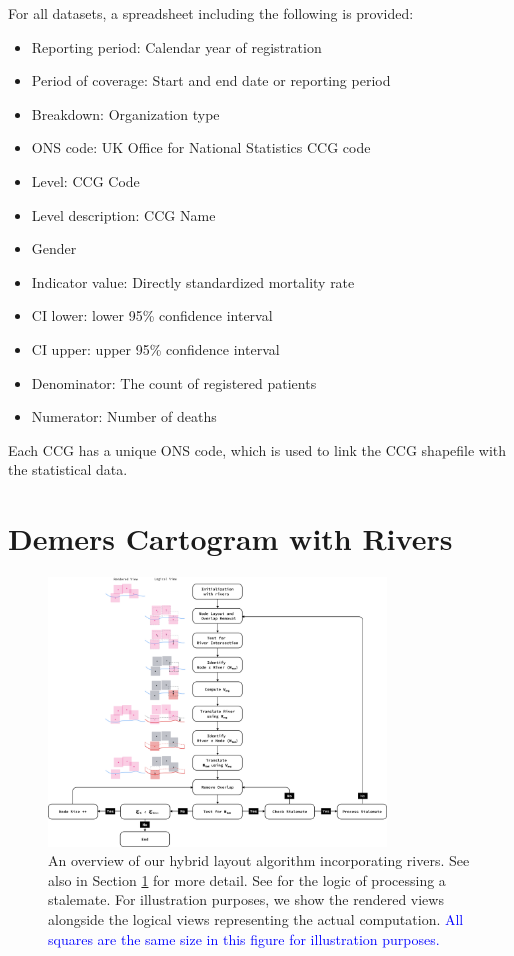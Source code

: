 \documentclass[Afour,sagev,times]{sagej}
\newcommand{\new}[1]{\textcolor{blue}{#1}}
\begin{document}
For all datasets, a spreadsheet including the following is provided:

\begin{itemize}
    \setlength\itemsep{0px}
    \item Reporting period: Calendar year of registration
    \item Period of coverage: Start and end date or reporting period
    \item Breakdown: Organization type
    \item ONS code: UK Office for National Statistics CCG code
    \item Level: CCG Code
    \item Level description: CCG Name
    \item Gender
    \item Indicator value: Directly standardized mortality rate
    \item CI lower: lower 95\% confidence interval
    \item CI upper: upper 95\% confidence interval
    \item Denominator: The count of registered patients
    \item Numerator: Number of deaths
\end{itemize}

Each CCG has a unique ONS code, which is used to link the CCG shapefile with the statistical data.

\section{Demers Cartogram with Rivers}
\label{sec:main}

{
    \begin{figure}[tb!]
        \centering
        \includegraphics[width=0.8\textwidth,height=\textheight,keepaspectratio]{flowchart.png}
        \caption{An overview of our hybrid layout algorithm incorporating rivers.
            See also  in Section \ref{sec:main} for more detail.
            See  for the logic of processing a stalemate.
            For illustration purposes, we show the rendered views alongside the logical views representing the actual computation. \new{All squares are the same size in this figure for illustration purposes.}}
        \label{fig:flowchart}
    \end{figure}
}
\end{document}

